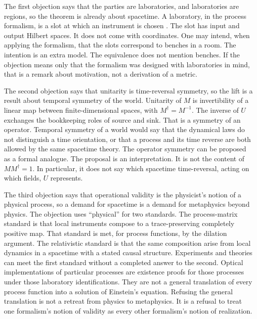 \documentclass[11pt]{article}
\begin{document}
The first objection says that the parties are laboratories, and laboratories are regions, so the theorem is already about spacetime. A laboratory, in the process formalism, is a slot at which an instrument is chosen \citep{oreshkov2012}. The slot has input and output Hilbert spaces. It does not come with coordinates. One may intend, when applying the formalism, that the slots correspond to benches in a room. The intention is an extra model. The equivalence does not mention benches. If the objection means only that the formalism was designed with laboratories in mind, that is a remark about motivation, not a derivation of a metric.

The second objection says that unitarity is time-reversal symmetry, so the lift is a result about temporal symmetry of the world. Unitarity of \(M\) is invertibility of a linear map between finite-dimensional spaces, with \(M^{\dagger}=M^{-1}\). The inverse of \(U\) exchanges the bookkeeping roles of source and sink. That is a symmetry of an operator. Temporal symmetry of a world would say that the dynamical laws do not distinguish a time orientation, or that a process and its time reverse are both allowed by the same spacetime theory. The operator symmetry can be proposed as a formal analogue. The proposal is an interpretation. It is not the content of \(MM^{\dagger}=1\). In particular, it does not say which spacetime time-reversal, acting on which fields, \(U\) represents.

The third objection says that operational validity is the physicist's notion of a physical process, so a demand for spacetime is a demand for metaphysics beyond physics. The objection uses ``physical'' for two standards. The process-matrix standard is that local instruments compose to a trace-preserving completely positive map. That standard is met, for process functions, by the dilation argument. The relativistic standard is that the same composition arise from local dynamics in a spacetime with a stated causal structure. Experiments and theories can meet the first standard without a completed answer to the second. Optical implementations of particular processes are existence proofs for those processes under those laboratory identifications. They are not a general translation of every process function into a solution of Einstein's equation. Refusing the general translation is not a retreat from physics to metaphysics. It is a refusal to treat one formalism's notion of validity as every other formalism's notion of realization.
\end{document}
